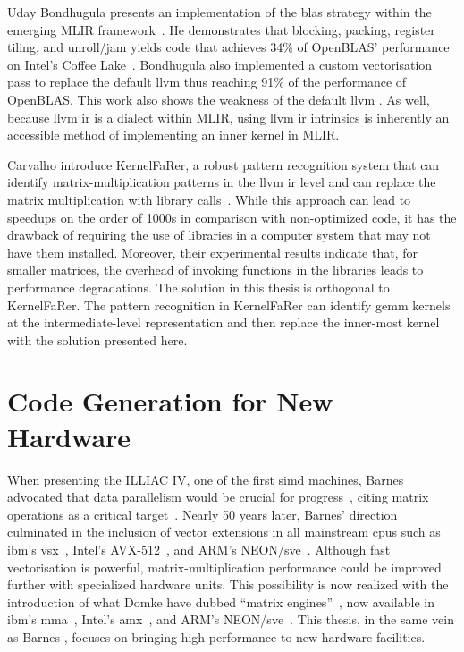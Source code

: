 \documentclass[\main/thesis.tex]{subfiles}
\begin{document}
Uday Bondhugula presents an implementation of the \gls{blas} strategy within the emerging MLIR framework~\autocite{bondhugula2020high}.
He demonstrates that blocking, packing, register tiling, and unroll/jam yields code that achieves 34\% of OpenBLAS' performance on Intel's Coffee Lake~\autocite{bondhugula2020high}.
Bondhugula also implemented a custom \gls{vectorisation} pass to replace the default \gls{llvm}  thus reaching 91\% of the performance of OpenBLAS.
This work also shows the weakness of the default \gls{llvm} .
As well, because \gls{llvm} \gls{ir} is a dialect within MLIR, using \gls{llvm} \gls{ir} \glspl{intrinsic} is inherently an accessible method of implementing an inner kernel in MLIR.

Carvalho \etal introduce KernelFaRer, a robust pattern recognition system that can identify matrix-multiplication patterns in the \gls{llvm} \gls{ir} level and can replace the matrix multiplication with library calls~\autocite{carvalho2021kernelfarer}.
While this approach can lead to speedups on the order of 1000s in comparison with non-optimized code, it has the drawback of requiring the use of libraries in a computer system that may not have them installed.
Moreover, their experimental results indicate that, for smaller matrices, the overhead of invoking functions in the libraries leads to performance degradations.
The solution in this thesis is orthogonal to KernelFaRer.
The pattern recognition in KernelFaRer can identify \gls{gemm} kernels at the intermediate-level representation and then replace the inner-most kernel with the solution presented here.

\section{Code Generation for New Hardware}
When presenting the ILLIAC IV, one of the first \gls{simd} machines, Barnes \etal advocated that data parallelism would be crucial for progress~\autocite{barnes1968illiac}, citing matrix operations as a critical target~\autocite{kuck1968illiac}.
Nearly 50 years later, Barnes' direction culminated in the inclusion of vector extensions in all mainstream \glspl{cpu} such as \gls{ibm}'s \gls{vsx}~\autocite{PowerISA}, Intel's AVX-512~\autocite{IntelISA}, and ARM's NEON/\gls{sve}~\autocite{ArmISA}.
Although fast \gls{vectorisation} is powerful, matrix-multiplication performance could be improved further with specialized hardware units.
This possibility is now realized with the introduction of what Domke \etal have dubbed ``matrix engines''~\autocite{domke2021matrix}, now available in \gls{ibm}'s \gls{mma}~\autocite{PowerISA}, Intel's \gls{amx}~\autocite{IntelISA}, and ARM's NEON/\gls{sve}~\autocite{ArmISA}.
This thesis, in the same vein as Barnes \etal, focuses on bringing high performance to new hardware facilities.
\end{document}
